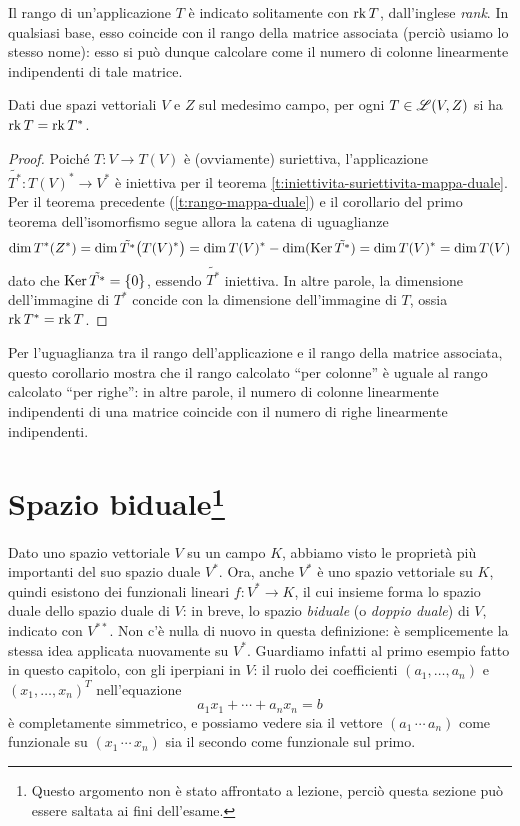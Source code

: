 Il rango di un'applicazione $T$ è indicato solitamente con $\operatorname{rk} T$, dall'inglese \textit{rank}.
In qualsiasi base, esso coincide con il rango della matrice associata (perciò usiamo lo stesso nome): esso si può dunque calcolare come il numero di colonne linearmente indipendenti di tale matrice.
\begin{corollario} \label{c:rango-righe-colonne}
	Dati due spazi vettoriali $V$ e $Z$ sul medesimo campo, per ogni $T\in\mathscr L(V,Z)$ si ha $\operatorname{rk} T=\operatorname{rk} T^*$.
\end{corollario}
\begin{proof}
	Poich\'e $T\colon V\to T(V)$ è (ovviamente) suriettiva, l'applicazione $\tilde{T^*}\colon T(V)^*\to V^*$ è iniettiva per il teorema \ref{t:iniettivita-suriettivita-mappa-duale}.
	Per il teorema precedente (\ref{t:rango-mappa-duale}) e il corollario del primo teorema dell'isomorfismo segue allora la catena di uguaglianze
	\begin{equation}
		\dim T^*(Z^*)=\dim\tilde{T^*}\big(T(V)^*\big)=\dim T(V)^*-\dim(\operatorname{Ker}\tilde{T^*})=\dim T(V)^*=\dim T(V)
	\end{equation}
	dato che $\operatorname{Ker}\tilde{T^*}=\{0\}$, essendo $\tilde{T^*}$ iniettiva.
	In altre parole, la dimensione dell'immagine di $T^*$ concide con la dimensione dell'immagine di $T$, ossia $\operatorname{rk} T^*=\operatorname{rk} T$.
\end{proof}
Per l'uguaglianza tra il rango dell'applicazione e il rango della matrice associata, questo corollario mostra che il rango calcolato ``per colonne'' è uguale al rango calcolato ``per righe'': in altre parole, il numero di colonne linearmente indipendenti di una matrice coincide con il numero di righe linearmente indipendenti.

\section[Spazio biduale]{Spazio biduale\footnote{
	Questo argomento non è stato affrontato a lezione, perciò questa sezione può essere saltata ai fini dell'esame.
}}
Dato uno spazio vettoriale $V$ su un campo $K$, abbiamo visto le proprietà più importanti del suo spazio duale $V^*$.
Ora, anche $V^*$ è uno spazio vettoriale su $K$, quindi esistono dei funzionali lineari $f\colon V^*\to K$, il cui insieme forma lo spazio duale dello spazio duale di $V$: in breve, lo spazio \emph{biduale} (o \emph{doppio duale}) di $V$, indicato con $V^{**}$.
Non c'è nulla di nuovo in questa definizione: è semplicemente la stessa idea applicata nuovamente su $V^*$.
Guardiamo infatti al primo esempio fatto in questo capitolo, con gli iperpiani in $V$: il ruolo dei coefficienti $(a_1,\dots,a_n)$ e $(x_1,\dots,x_n)^T$ nell'equazione
\begin{equation*}
	a_1x_1+\cdots+a_nx_n=b
\end{equation*}
è completamente simmetrico, e possiamo vedere sia il vettore $(a_1\,\cdots\,a_n)$ come funzionale su $(x_1\,\cdots\,x_n)$ sia il secondo come funzionale sul primo.

